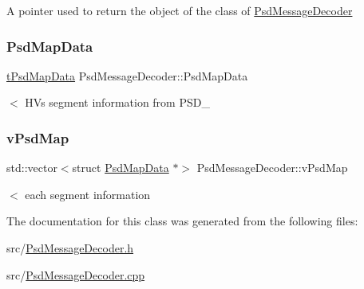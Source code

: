 A pointer used to return the object of the class of \hyperlink{class_psd_message_decoder}{Psd\+Message\+Decoder} \mbox{\label{class_psd_message_decoder_a72e477b8bdb225e09f970bc32fff5bde}} 
\subsubsection{\texorpdfstring{Psd\+Map\+Data}{PsdMapData}}
{\footnotesize\ttfamily \hyperlink{_psd_message_decoder_8h_ad54e183dd7c544312c06d4bd6279ebdc}{t\+Psd\+Map\+Data} Psd\+Message\+Decoder\+::\+Psd\+Map\+Data}

$<$ HV\textquotesingle{}s segment information from P\+S\+D\+\_ \mbox{\label{class_psd_message_decoder_ae73cfd8f47a3af30d9ae199d73ef4781}} 
\subsubsection{\texorpdfstring{v\+Psd\+Map}{vPsdMap}}
{\footnotesize\ttfamily std\+::vector$<$struct \hyperlink{struct_psd_map_data}{Psd\+Map\+Data} $\ast$$>$ Psd\+Message\+Decoder\+::v\+Psd\+Map}

$<$ each segment information 

The documentation for this class was generated from the following files\+:\begin{DoxyCompactItemize}
\item 
src/\hyperlink{_psd_message_decoder_8h}{Psd\+Message\+Decoder.\+h}\item 
src/\hyperlink{_psd_message_decoder_8cpp}{Psd\+Message\+Decoder.\+cpp}\end{DoxyCompactItemize}

